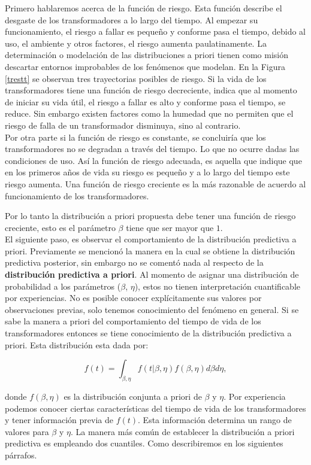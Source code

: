 \noindent Primero hablaremos acerca de la funci\'on de riesgo.  Esta funci\'on describe el desgaste de los transformadores a lo largo del tiempo. Al empezar su funcionamiento, el riesgo a fallar es peque\~no y conforme pasa el tiempo, debido al uso, el ambiente y otros factores, el riesgo aumenta paulatinamente. La determinaci\'on o modelaci\'on de las distribuciones a priori tienen como misi\'on descartar entornos improbables de los fen\'omenos que modelan. En la Figura  \ref{trestt} se observan tres trayectorias posibles de riesgo.
Si la vida de los transformadores tiene una funci\'on de riesgo decreciente, indica  que al momento de iniciar su vida \'util, el riesgo a fallar es alto y conforme pasa el tiempo, se reduce.  Sin embargo existen factores como la humedad que no permiten que el riesgo de falla de un transformador disminuya, sino al contrario.\\[0.1cm]
\noindent  Por otra parte si la funci\'on de riesgo es constante, se concluir\'ia que los transformadores no se degradan a trav\'es del tiempo. Lo que no ocurre dadas las condiciones de uso.
\noindent As\'i la funci\'on de riesgo adecuada, es aquella que indique que en los primeros a\~nos de vida su riesgo es peque\~no y a lo largo del tiempo este riesgo aumenta. Una funci\'on de riesgo creciente es la m\'as razonable de acuerdo al funcionamiento de los transformadores. 

\noindent Por lo tanto la distribuci\'on a priori propuesta debe tener una funci\'on de riesgo creciente, esto es el par\'ametro $\beta$ tiene que ser mayor que $1$. \\[0.1cm]
\noindent
El siguiente paso, es observar el comportamiento de la distribuci\'on predictiva a priori. Previamente se mencion\'o la manera en la cual se obtiene la distribuci\'on predictiva posterior, sin embargo no se coment\'o nada al respecto de la {\bf distribuci\'on predictiva a priori}.  Al momento de asignar una distribuci\'on de probabilidad a los par\'ametros ($\beta$, $\eta$), estos no tienen interpretaci\'on cuantificable por experiencias. No es posible conocer expl\'icitamente sus valores por observaciones previas, solo tenemos conocimiento del fen\'omeno en general. Si se sabe la manera a priori del comportamiento del tiempo de vida de los transformadores entonces se tiene conocimiento de la distribuci\'on predictiva a priori. Esta distribuci\'on esta dada por:

 $$f(t)=\int_{\beta,\eta}f(t|\beta,\eta)  f(\beta,\eta)d\beta d \eta,$$
 
 \noindent donde  $f(\beta,\eta)$ es la distribuci\'on conjunta a priori de $\beta$ y $\eta$.
\noindent Por experiencia podemos conocer ciertas caracter\'isticas del tiempo de vida de los transformadores y  tener informaci\'on previa de  $f(t)$. Esta informaci\'on determina un rango de valores para $\beta$ y $\eta$. La manera m\'as com\'un de establecer la distribuci\'on  a priori predictiva es empleando dos cuantiles. Como describiremos en los siguientes p\'arrafos.\\[0.1cm]


